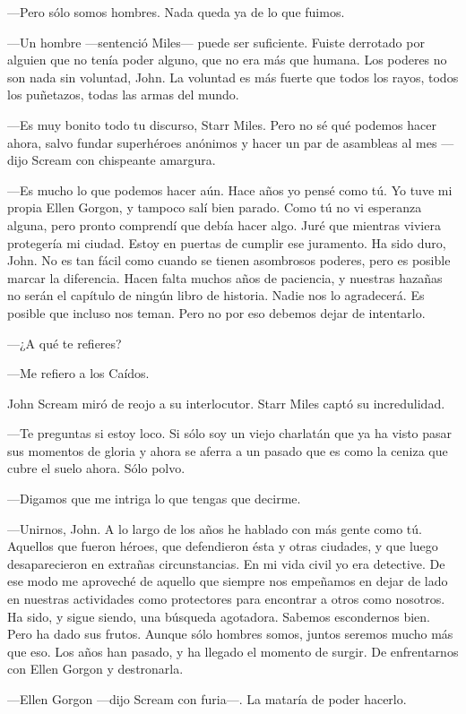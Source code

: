 ---Pero sólo somos hombres. Nada queda ya de lo que fuimos.

---Un hombre ---sentenció Miles--- puede ser suficiente. Fuiste derrotado por alguien que no tenía poder alguno, que no era más que humana. Los poderes no son nada sin voluntad, John. La voluntad es más fuerte que todos los rayos, todos los puñetazos, todas las armas del mundo.

---Es muy bonito todo tu discurso, Starr Miles. Pero no sé qué podemos hacer ahora, salvo fundar superhéroes anónimos y hacer un par de asambleas al mes ---dijo Scream con chispeante amargura.

---Es mucho lo que podemos hacer aún. Hace años yo pensé como tú. Yo tuve mi propia Ellen Gorgon, y tampoco salí bien parado. Como tú no vi esperanza alguna, pero pronto comprendí que debía hacer algo. Juré que mientras viviera protegería mi ciudad. Estoy en puertas de cumplir ese juramento. Ha sido duro, John. No es tan fácil como cuando se tienen asombrosos poderes, pero es posible marcar la diferencia. Hacen falta muchos años de paciencia, y nuestras hazañas no serán el capítulo de ningún libro de historia. Nadie nos lo agradecerá. Es posible que incluso nos teman. Pero no por eso debemos dejar de intentarlo.

---¿A qué te refieres?

---Me refiero a los Caídos.

John Scream miró de reojo a su interlocutor. Starr Miles captó su incredulidad.

---Te preguntas si estoy loco. Si sólo soy un viejo charlatán que ya ha visto pasar sus momentos de gloria y ahora se aferra a un pasado que es como la ceniza que cubre el suelo ahora. Sólo polvo.

---Digamos que me intriga lo que tengas que decirme.

---Unirnos, John. A lo largo de los años he hablado con más gente como tú. Aquellos que fueron héroes, que defendieron ésta y otras ciudades, y que luego desaparecieron en extrañas circunstancias. En mi vida civil yo era detective. De ese modo me aproveché de aquello que siempre nos empeñamos en dejar de lado en nuestras actividades como protectores para encontrar a otros como nosotros. Ha sido, y sigue siendo, una búsqueda agotadora. Sabemos escondernos bien. Pero ha dado sus frutos. Aunque sólo hombres somos, juntos seremos mucho más que eso. Los años han pasado, y ha llegado el momento de surgir. De enfrentarnos con Ellen Gorgon y destronarla.

---Ellen Gorgon ---dijo Scream con furia---. La mataría de poder hacerlo.

